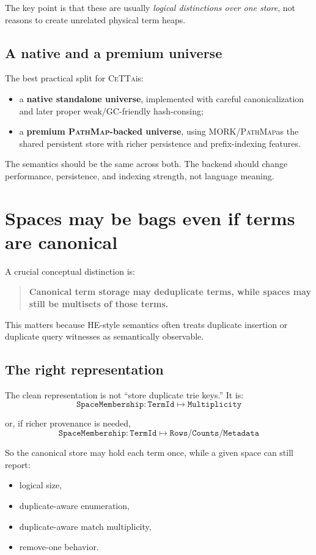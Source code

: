 \documentclass[11pt]{article}
\newcommand{\CeTTa}{\textsc{CeTTa}}
\newcommand{\PathMap}{\textsc{PathMap}}
\newcommand{\MORK}{\textsc{MORK}}
\newcommand{\HE}{\textsc{HE}}
\begin{document}
The key point is that these are usually \emph{logical distinctions over one store}, not reasons to create unrelated physical term heaps.

\subsection{A native and a premium universe}
The best practical split for \CeTTa is:
\begin{itemize}
    \item a \textbf{native standalone universe}, implemented with careful canonicalization and later proper weak/GC-friendly hash-consing;
    \item a \textbf{premium \PathMap-backed universe}, using \MORK/\PathMap as the shared persistent store with richer persistence and prefix-indexing features.
\end{itemize}

The semantics should be the same across both. The backend should change performance, persistence, and indexing strength, not language meaning.

\section{Spaces may be bags even if terms are canonical}
A crucial conceptual distinction is:
\begin{quote}
\textbf{Canonical term storage may deduplicate terms, while spaces may still be multisets of those terms.}
\end{quote}

This matters because \HE-style semantics often treats duplicate insertion or duplicate query witnesses as semantically observable.

\subsection{The right representation}
The clean representation is not ``store duplicate trie keys.'' It is:
\[
\texttt{SpaceMembership} : \texttt{TermId} \mapsto \texttt{Multiplicity}
\]

or, if richer provenance is needed,
\[
\texttt{SpaceMembership} : \texttt{TermId} \mapsto \texttt{Rows/Counts/Metadata}
\]

So the canonical store may hold each term once, while a given space can still report:
\begin{itemize}
    \item logical size,
    \item duplicate-aware enumeration,
    \item duplicate-aware match multiplicity,
    \item remove-one behavior.
\end{itemize}
\end{document}
